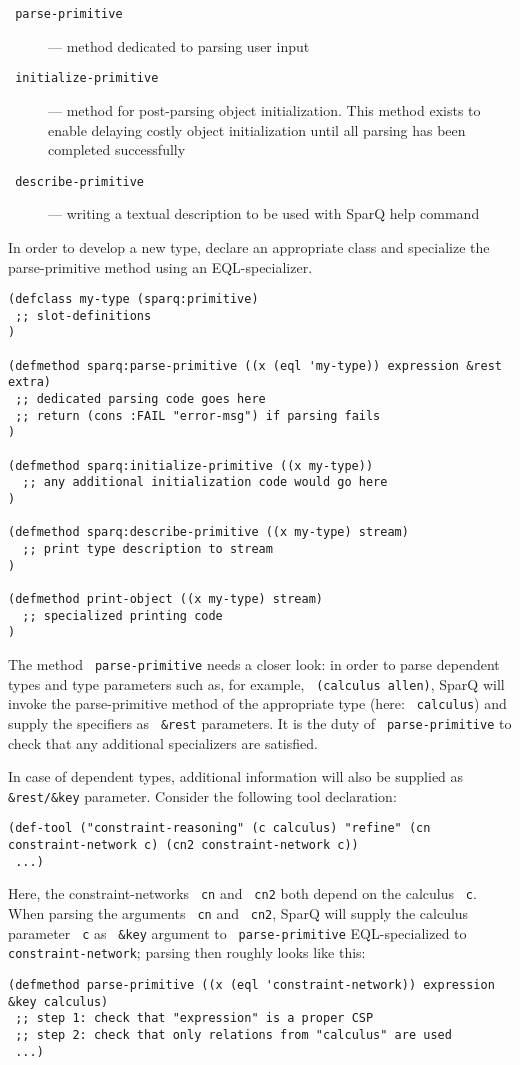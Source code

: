 \documentclass[headsepline]{scrreprt}
\theoremstyle{definition}
\newlength{\rest}
\newcommand{\engine}{SparQ}
\begin{document}
\begin{description}
	\item[\texttt{ parse-primitive}]--- method dedicated to parsing user input
	\item[\texttt{ initialize-primitive}]--- method for post-parsing object initialization. This method exists to enable delaying costly object initialization until all parsing has been completed successfully
	\item[\texttt{ describe-primitive}]--- writing a textual description to be used with \engine{} help command
\end{description}

In order to develop a new type, declare an appropriate class and specialize the parse-primitive method using an EQL-specializer.
\begin{lstlisting}
(defclass my-type (sparq:primitive)
 ;; slot-definitions
)

(defmethod sparq:parse-primitive ((x (eql 'my-type)) expression &rest extra)
 ;; dedicated parsing code goes here
 ;; return (cons :FAIL "error-msg") if parsing fails
)

(defmethod sparq:initialize-primitive ((x my-type))
  ;; any additional initialization code would go here
)

(defmethod sparq:describe-primitive ((x my-type) stream)
  ;; print type description to stream
)

(defmethod print-object ((x my-type) stream)
  ;; specialized printing code
)
\end{lstlisting}

The method \texttt{ parse-primitive} needs a closer look: in order to parse dependent types and type parameters such as, for example, \texttt{ (calculus allen)}, \engine{} will invoke the parse-primitive method of the appropriate type (here: \texttt{ calculus}) and supply the specifiers as \texttt{ \&rest} parameters. 
It is the duty of \texttt{ parse-primitive} to check that any additional specializers are satisfied.

In case of dependent types, additional information will also be supplied as \texttt{ \&rest/\&key} parameter. 
Consider the following tool declaration:

\begin{lstlisting}
(def-tool ("constraint-reasoning" (c calculus) "refine" (cn constraint-network c) (cn2 constraint-network c))
 ...)
\end{lstlisting}

Here, the constraint-networks \texttt{ cn} and \texttt{ cn2} both depend on the calculus \texttt{ c}. 
When parsing the arguments \texttt{ cn} and \texttt{ cn2}, \engine{} will supply the calculus parameter \texttt{ c} as \texttt{ \&key} argument to \texttt{ parse-primitive} EQL-specialized to \texttt{ constraint-network}; parsing then roughly looks like this:
\begin{lstlisting}
(defmethod parse-primitive ((x (eql 'constraint-network)) expression &key calculus)
 ;; step 1: check that "expression" is a proper CSP
 ;; step 2: check that only relations from "calculus" are used
 ...)
\end{lstlisting}
\end{document}

